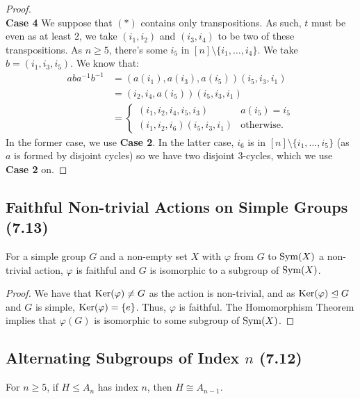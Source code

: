 \begin{proof}
    \\[\baselineskip]
    \textbf{Case 4}
    We suppose that $(\ast)$ contains only transpositions.
    As such, $t$ must be even as at least 2, we take $(i_1, i_2)$
    and $(i_3, i_4)$ to be two of these transpositions. As $n \geq 5$,
    there's some $i_5$ in $[n] \setminus \{i_1, \ldots, i_4\}$. We
    take $b = (i_1, i_3, i_5)$. We know that: \begin{align*}
        aba^{-1}b^{-1}
        &= (a(i_1), a(i_3), a(i_5))(i_5, i_3, i_1) \\
        &= (i_2, i_4, a(i_5))(i_5, i_3, i_1) \\
        &= \begin{cases}
            (i_1, i_2, i_4, i_5, i_3) & a(i_5) = i_5 \\
            (i_1, i_2, i_6)(i_5, i_3, i_1) & \text{otherwise}.
        \end{cases}
    \end{align*} In the former case, we use \textbf{Case 2}.
    In the latter case, $i_6$ is in $[n] \setminus 
    \{i_1, \ldots, i_5\}$ (as $a$ is formed by disjoint cycles)
    so we have two disjoint 3-cycles, which we use \textbf{Case 2}
    on.
\end{proof}

\subsection{Faithful Non-trivial Actions on Simple Groups (7.13)} \label{7.13}

For a simple group $G$ and a non-empty set $X$ with $\varphi$
from $G$ to $\operatorname{Sym}(X)$ a non-trivial action, $\varphi$ is
faithful and $G$ is isomorphic to a subgroup of $\operatorname{Sym}(X)$.

\begin{proof}
    We have that $\operatorname{Ker}(\varphi) \neq G$ as the action is non-trivial,
    and as $\operatorname{Ker}(\varphi) \trianglelefteq G$ and $G$ is simple, $\operatorname{Ker}(\varphi)
    = \{e\}$. Thus, $\varphi$ is faithful. The Homomorphism Theorem
    implies that $\varphi(G)$ is isomorphic to some subgroup of 
    $\operatorname{Sym}(X)$.
\end{proof}

\subsection{Alternating Subgroups of Index $n$ (7.12)} \label{7.12}

For $n \geq 5$, if $H \leq A_n$ has index $n$, then $H \cong A_{n - 1}$.

